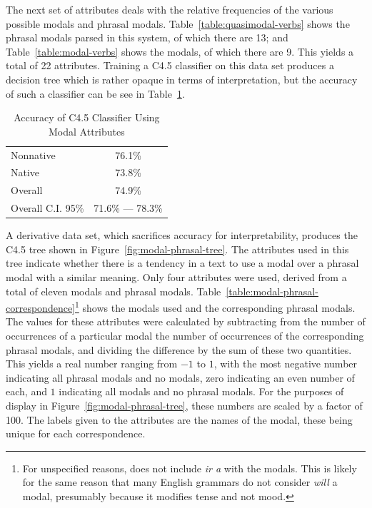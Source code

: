 \documentclass[main.tex]{subfiles}
\begin{document}
The next set of attributes deals with the relative frequencies of the various possible modals and phrasal modals. Table~\ref{table:quasimodal-verbs} shows the phrasal modals parsed in this system, of which there are 13; and Table~\ref{table:modal-verbs} shows the modals, of which there are 9. This yields a total of 22 attributes. Training a C4.5 classifier on this data set produces a decision tree which is rather opaque in terms of interpretation, but the accuracy of such a classifier can be see in Table~\ref{table:modal-attributes-results}. 
\begin{table}[htbp]
\centering
\caption{Accuracy of C4.5 Classifier Using Modal Attributes}
\begin{tabular}{l c}
\toprule
Nonnative & 76.1\% \\
Native & 73.8\% \\
Overall & 74.9\% \\
Overall C.I. 95\% & 71.6\% --- 78.3\%\\
\bottomrule
\end{tabular}
\label{table:modal-attributes-results}
\end{table}
A derivative data set, which sacrifices accuracy for interpretability, produces the C4.5 tree shown in Figure~\ref{fig:modal-phrasal-tree}. The attributes used in this tree indicate whether there is a tendency in a text to use a modal over a phrasal modal with a similar meaning. Only four attributes were used, derived from a total of eleven modals and phrasal modals. Table~\ref{table:modal-phrasal-correspondence}\footnote{For unspecified reasons, \citet{butt} does not include \textit{ir a} with the modals. This is likely for the same reason that many English grammars do not consider \textit{will} a modal, presumably because it modifies tense and not mood.} shows the modals used and the corresponding phrasal modals. The values for these attributes were calculated by subtracting from the number of occurrences of a particular modal the number of occurrences of the corresponding phrasal modals, and dividing the difference by the sum of these two quantities. This yields a real number ranging from $-1$ to $1$, with the most negative number indicating all phrasal modals and no modals, zero indicating an even number of each, and $1$ indicating all modals and no phrasal modals. For the purposes of display in Figure~\ref{fig:modal-phrasal-tree}, these numbers are scaled by a factor of 100. The labels given to the attributes are the names of the modal, these being unique for each correspondence.
\end{document}

